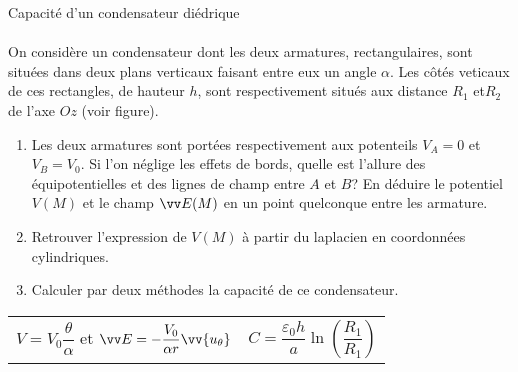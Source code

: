 \documentclass[french, a4paper, 11pt]{article}
\newcommand{\po}{\left(}         %
\newcommand{\pf}{\right)}        %
\newcommand{\pof}[1]{\po #1 \pf} %
\newcommand{\uth}{\vv{u_\theta}}    %
\begin{document}
\begin{cadre}{Capacité d'un condensateur diédrique}
  \begin{minipage}{0.65\linewidth}
  \paragraph*{}
  On considère un condensateur dont les deux armatures, rectangulaires, sont situées dans deux plans verticaux faisant entre eux un angle \(\alpha\). Les côtés veticaux de ces rectangles, de hauteur \(h\), sont respectivement situés aux distance \(R_{1}\) et\(R_{2}\) de l'axe \(Oz\) (voir figure).
  \end{minipage}
  \begin{minipage}{0.3\linewidth}
  \end{minipage}
  \begin{enumerate}[label=\upshape\alph*)]
    \item Les deux armatures sont portées respectivement aux potenteils \(V_{A}=0\) et \(V_{B} = V_{0}\). Si l'on néglige les effets de bords, quelle est l'allure des équipotentielles et des lignes de champ entre \(A\) et \(B\)? En déduire le potentiel \(V(M)\) et le champ \(\vv E(M)\) en un point quelconque entre les armature.
    \item Retrouver l'expression de \(V(M)\) à partir du laplacien en coordonnées cylindriques.
    \item Calculer par deux méthodes la capacité de ce condensateur.
  \end{enumerate}
  \tcblower
  \begin{tabularx}{\linewidth}{Xr}
    \(V=V_{0}\dfrac{\theta}{\alpha}\) et \(\vv E = -\dfrac{V_{0}}{\alpha r}\uth\) &
    \(C = \dfrac{\varepsilon_{0}h}{a}\ln\pof{\dfrac{R_{1}}{R_{1}}}\)
  \end{tabularx}
\end{cadre}
\end{document}
